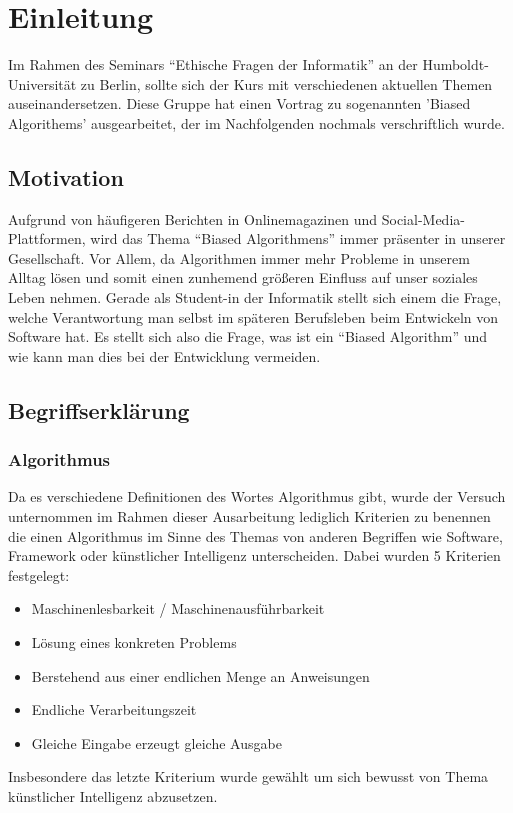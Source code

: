 \chapter{Einleitung}

Im Rahmen des Seminars \enquote{Ethische Fragen der Informatik} an der Humboldt-Universität zu Berlin, sollte sich der Kurs mit verschiedenen aktuellen Themen auseinandersetzen. Diese Gruppe hat einen Vortrag zu sogenannten 'Biased Algorithems' ausgearbeitet, der im Nachfolgenden nochmals verschriftlich wurde.

\section{Motivation}

Aufgrund von häufigeren Berichten in Onlinemagazinen und Social-Media-Plattformen, wird das Thema \enquote{Biased Algorithmens} immer präsenter in unserer Gesellschaft. Vor Allem, da Algorithmen immer mehr Probleme in unserem Alltag lösen und somit einen zunhemend größeren Einfluss auf unser soziales Leben nehmen.
Gerade als Student-in der Informatik stellt sich einem die Frage, welche Verantwortung man selbst im späteren Berufsleben beim Entwickeln von Software hat. Es stellt sich also die Frage, was ist ein \enquote{Biased Algorithm} und wie kann man dies bei der Entwicklung vermeiden.



\section{Begriffserklärung}


\subsection{Algorithmus}
Da es verschiedene Definitionen des Wortes Algorithmus gibt, wurde der Versuch unternommen im Rahmen dieser Ausarbeitung lediglich Kriterien zu benennen die einen Algorithmus im Sinne des Themas von anderen Begriffen wie Software, Framework oder künstlicher Intelligenz unterscheiden. Dabei wurden 5 Kriterien festgelegt:
\begin{itemize}
	\item Maschinenlesbarkeit / Maschinenausführbarkeit
	\item Lösung eines konkreten Problems
	\item Berstehend aus einer endlichen Menge an Anweisungen
	\item Endliche Verarbeitungszeit
	\item Gleiche Eingabe erzeugt gleiche Ausgabe
\end{itemize}
Insbesondere das letzte Kriterium wurde gewählt um sich bewusst von Thema künstlicher Intelligenz abzusetzen.

